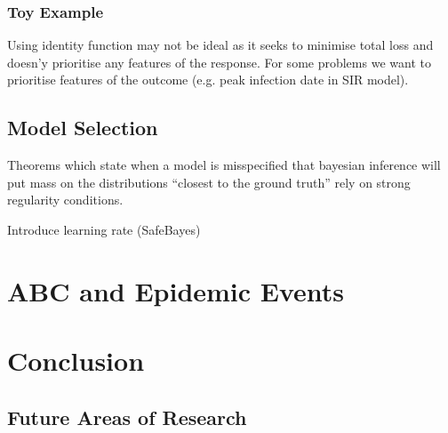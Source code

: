 \documentclass[11pt,a4paper]{article}
\theoremstyle{break}
\begin{document}
\subsubsection{Toy Example}\label{sec_summary_statistics_toy}

  Using identity function may not be ideal as it seeks to minimise total loss and doesn'y prioritise any features of the response. For some problems we want to prioritise features of the outcome (e.g. peak infection date in SIR model).

\subsection{Model Selection}

  \par Theorems which state when a model is misspecified that bayesian inference will put mass on the distributions ``closest to the ground truth'' rely on strong regularity conditions. \cite[]{inconsistency_of_bayesian_inference_for_misspecified_linear_models_and_a_proposal_for_reparing_it}
  \par Introduce learning rate (SafeBayes) \cite[]{inconsistency_of_bayesian_inference_for_misspecified_linear_models_and_a_proposal_for_reparing_it}

\newpage
\section{ABC and Epidemic Events}\label{sec_abc_and_epidemic_events}

\newpage
\section{Conclusion}

\subsection{Future Areas of Research}


\newpage
\setcounter{page}{1}


\end{document}
